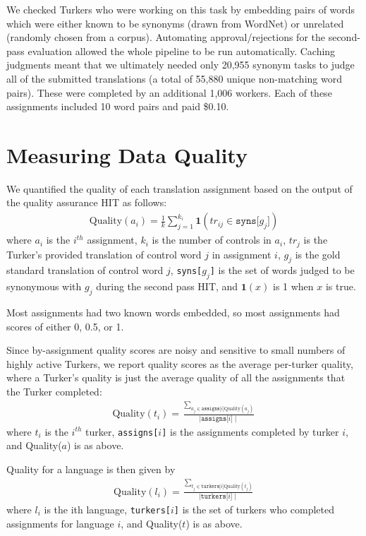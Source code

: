 \documentclass[11pt]{article}
\begin{document}
We checked Turkers who were working on this task by embedding pairs of words which were either known to be synonyms (drawn from WordNet) or  unrelated (randomly chosen from a corpus). 
Automating approval/rejections for the second-pass evaluation allowed the whole pipeline to be run automatically.  Caching judgments meant that we ultimately needed only 
20,955 synonym tasks to judge all of the submitted translations (a total of 55,880 unique non-matching word pairs).  These were completed by an additional 1,006 workers.  Each of these assignments included 10 word pairs and paid \$0.10.

\section{Measuring Data Quality}

We quantified the quality of each translation assignment based on the output of the quality assurance HIT as follows:
\begin{align}	
	\text{Quality}(a_i) = \frac{1}{k}\sum\limits_{j=1}^{k_i}\mathbf{1}(tr_{ij} \in \texttt{syns[$g_j$]})
\end{align}	
where $a_i$ is the $i^{th}$ assignment, $k_i$ is the number of controls in $a_i$, $tr_j$ is the Turker's provided translation of control word $j$ in assignment $i$, $g_j$ is the gold standard translation of control word $j$, \texttt{syns[$g_j$]} is the set of words judged to be synonymous with $g_j$ during the second pass HIT, and $\mathbf{1}(x)$ is 1 when $x$ is true. 

Most assignments had two known words embedded, so most assignments had scores of either 0, 0.5, or 1. 

Since by-assignment quality scores are noisy and sensitive to small numbers of highly active Turkers, we report quality scores as the average per-turker quality, where a Turker's quality is just the average quality of all the assignments that the Turker completed:
\begin{align}	
	\text{Quality}(t_i) = \frac{\sum_{a_j \in \texttt{assigns[$i$]}\text{Quality}(a_j)}}{\mid \texttt{assigns[$i$]} \mid}
\end{align}	
where $t_i$ is the $i^{th}$ turker, \texttt{assigns[$i$]} is the assignments completed by turker $i$, and Quality($a$) is as above.
	
Quality for a language is then given by
\begin{align}	
	\text{Quality}(l_i) = \frac{\sum_{t_j \in \texttt{turkers[$i$]}\text{Quality}(t_j)}}{\mid \texttt{turkers[$i$]} \mid}
\end{align}	
where $l_i$ is the ith language, \texttt{turkers[$i$]} is the set of turkers who completed assignments for language $i$, and Quality($t$) is as above.
\end{document}
